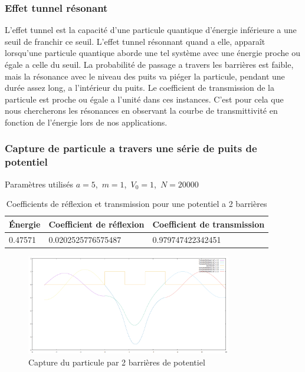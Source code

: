 \subsubsection{Effet tunnel résonant}
\par L'effet tunnel est la capacité d'une particule quantique d'énergie inférieure a une seuil de franchir ce seuil. L'effet tunnel résonnant\cite{frwiki:182320873} quand a elle, apparaît lorsqu'une particule quantique aborde une tel système avec une énergie proche ou égale a celle du seuil. La probabilité de passage a travers les barrières est faible, mais la résonance avec le niveau des puits va piéger la particule, pendant une durée assez long, a l'intérieur du puits. Le coefficient de transmission de la particule est proche ou égale a l'unité dans ces instances. C'est pour cela que nous chercherons les résonances en observant la courbe de transmittivité en fonction de l'énergie lors de nos applications. 

\subsubsection{Capture de particule a travers une série de puits de potentiel}

\begin{table}[!ht]
\centering
Paramètres utilisés  $a=5$,\ $m=1$,\ $V_{0}=1$,\ $ N=20000 $\\
\begin{tabular}{|l|l|l|}
\hline  Énergie & Coefficient de réflexion  & Coefficient de transmission \\
\hline  0.47571 &  0.0202525776575487 &  0.979747422342451\\
\hline
\end{tabular}
\caption{Coefficients de réflexion et transmission pour une potentiel a 2 barrières}
\label{tab12}
\end{table}

\begin{figure}[!ht]
    \centering
    \includegraphics[width=0.8\textwidth]{2barriers Potentiel/2barReson.png}
    \caption{Capture du particule par 2 barrières de potentiel}
    \label{fig:my_label}
\end{figure}


